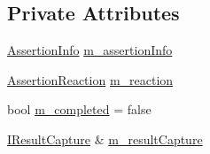 \subsection*{Private Attributes}
\begin{DoxyCompactItemize}
\item 
\hyperlink{struct_catch_1_1_assertion_info}{Assertion\-Info} \hyperlink{class_catch_1_1_assertion_handler_ad171e8724bb771d97949b7270f400303}{m\-\_\-assertion\-Info}
\item 
\hyperlink{struct_catch_1_1_assertion_reaction}{Assertion\-Reaction} \hyperlink{class_catch_1_1_assertion_handler_a8203c08a43a3761b5f400ee6587fad55}{m\-\_\-reaction}
\item 
bool \hyperlink{class_catch_1_1_assertion_handler_a5a756818dff781c155e8eb970d1d4c68}{m\-\_\-completed} = false
\item 
\hyperlink{struct_catch_1_1_i_result_capture}{I\-Result\-Capture} \& \hyperlink{class_catch_1_1_assertion_handler_aea5283ee36124ce5c51dc2a697b22a39}{m\-\_\-result\-Capture}
\end{DoxyCompactItemize}


